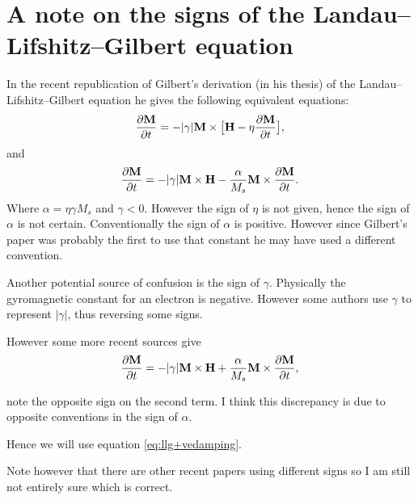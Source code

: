
\section{A note on the signs of the Landau--Lifshitz--Gilbert equation}
\label{sec:note-signs-llg}

In the recent republication of Gilbert's derivation (in his thesis) of the Landau--Lifshitz--Gilbert equation he gives the following equivalent equations:
\begin{equation}
  \frac{\partial \mathbf{M}}{\partial t} = - |\gamma| \mathbf{M} \times \big[ \mathbf{H} - \eta \frac{\partial \mathbf{M}}{\partial t} \big],
\end{equation}
and
\begin{equation}
  \frac{\partial \mathbf{M}}{\partial t} = - |\gamma| \mathbf{M} \times \mathbf{H} - \frac{\alpha}{M_s} \mathbf{M} \times \frac{\partial \mathbf{M}}{\partial t}.
  \label{eq:llg-vedamping}
\end{equation}
Where $\alpha = \eta \gamma M_s$ and $\gamma < 0$. However the sign of $\eta$ is not given, hence the sign of $\alpha$ is not certain. Conventionally the sign of $\alpha$ is positive. However since Gilbert's paper was probably the first to use that constant he may have used a different convention.

Another potential source of confusion is the sign of $\gamma$. Physically the gyromagnetic constant for an electron is negative. However some authors use $\gamma$ to represent $|\gamma|$, thus reversing some signs.

However some more recent sources\cite{Fidler2000}\cite{nmag-manual}\cite{Lopez-Diaz2012} give
\begin{equation}
  \frac{\partial \mathbf{M}}{\partial t} = - |\gamma| \mathbf{M} \times \mathbf{H} + \frac{\alpha}{M_s} \mathbf{M} \times \frac{\partial \mathbf{M}}{\partial t},
  \label{eq:llg+vedamping}
\end{equation}

note the opposite sign on the second term. I think this discrepancy is due to opposite conventions in the sign of $\alpha$.

Hence we will use equation \eqref{eq:llg+vedamping}.

Note however that there are other recent papers using different signs so I am still not entirely sure which is correct.



